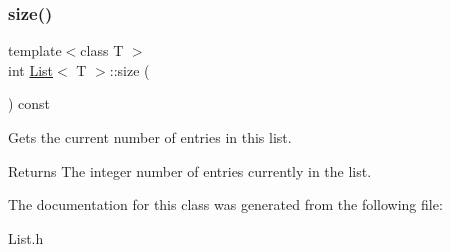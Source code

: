 \subsubsection{\texorpdfstring{size()}{size()}}
{\footnotesize\ttfamily template$<$class T $>$ \\
int \hyperlink{class_list}{List}$<$ T $>$\+::size (\begin{DoxyParamCaption}{ }\end{DoxyParamCaption}) const}

Gets the current number of entries in this list. \begin{DoxyReturn}{Returns}
The integer number of entries currently in the list. 
\end{DoxyReturn}


The documentation for this class was generated from the following file\+:\begin{DoxyCompactItemize}
\item 
List.\+h\end{DoxyCompactItemize}
